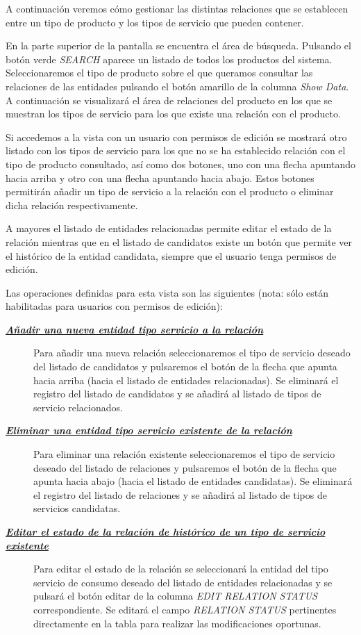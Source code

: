 A continuación veremos cómo gestionar las distintas relaciones que se establecen entre un tipo de producto y los tipos de servicio que pueden contener.


En la parte superior de la pantalla se encuentra el área de búsqueda. Pulsando el botón verde \emph{SEARCH} aparece un listado de todos los productos del sistema. Seleccionaremos el tipo de producto sobre el que queramos consultar las relaciones de las entidades pulsando el botón amarillo de la columna \emph{Show Data}. A continuación se visualizará el área de relaciones del producto en los que se muestran los tipos de servicio para los que existe una relación con el producto.

Si accedemos a la vista con un usuario con permisos de edición se mostrará otro listado con los tipos de servicio para los que no se ha establecido relación con el tipo de producto consultado, así como dos botones, uno con una flecha apuntando hacia arriba y otro con una flecha apuntando hacia abajo. Estos botones permitirán añadir un tipo de servicio a la relación con el producto o eliminar dicha relación respectivamente. 

A mayores el listado de entidades relacionadas permite editar el estado de la relación mientras que en el listado de candidatos existe un botón que permite ver el histórico de la entidad candidata, siempre que el usuario tenga permisos de edición.


Las operaciones definidas para esta vista son las siguientes (nota: sólo están habilitadas para usuarios con permisos de edición):
\begin{description}
\item[\underline{\textsl{\textbf{Añadir una nueva entidad tipo servicio a la relación}}}] Para añadir una nueva relación seleccionaremos el tipo de servicio deseado del listado de candidatos y pulsaremos el botón de la flecha que apunta hacia arriba (hacia el listado de entidades relacionadas). Se eliminará el registro del listado de candidatos y se añadirá al listado de tipos de servicio relacionados.

\item[\underline{\textsl{\textbf{Eliminar una entidad tipo servicio existente de la relación}}}] Para eliminar una relación existente seleccionaremos el tipo de servicio deseado del listado de relaciones y pulsaremos el botón de la flecha que apunta hacia abajo (hacia el listado de entidades candidatas). Se eliminará el registro del listado de relaciones y se añadirá al listado de tipos de servicios candidatas.

\item[\underline{\textsl{\textbf{Editar el estado de la relación de histórico de un tipo de servicio existente}}}] Para editar el estado de la relación se seleccionará la entidad del tipo servicio de consumo deseado del listado de entidades relacionadas y se pulsará el botón editar de la columna \textit{EDIT RELATION STATUS} correspondiente. Se editará el campo \emph{RELATION STATUS} pertinentes directamente en la tabla para realizar las modificaciones oportunas.
\end{description}



